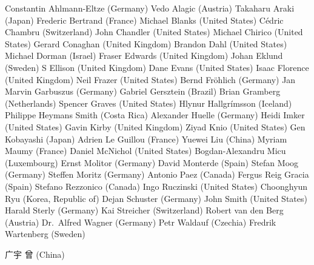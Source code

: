 Constantin Ahlmann-Eltze (Germany)
Vedo Alagic (Austria)
Takaharu Araki (Japan)
Frederic Bertrand (France)
Michael Blanks (United States)
Cédric Chambru (Switzerland)
John Chandler (United States)
Michael Chirico (United States)
Gerard Conaghan (United Kingdom)
Brandon Dahl (United States)
Michael Dorman (Israel)
Fraser Edwards (United Kingdom)
Johan Eklund (Sweden)
S Ellison (United Kingdom)
Dane Evans (United States)
Isaac Florence (United Kingdom)
Neil Frazer (United States)
Bernd Fröhlich (Germany)
Jan Marvin Garbuszus (Germany)
Gabriel Gersztein (Brazil)
Brian Gramberg (Netherlands)
Spencer Graves (United States)
Hlynur Hallgrímsson (Iceland)
Philippe Heymans Smith (Costa Rica)
Alexander Huelle (Germany)
Heidi Imker (United States)
Gavin Kirby (United Kingdom)
Ziyad Knio (United States)
Gen Kobayashi (Japan)
Adrien Le Guillou (France)
Yuewei Liu (China)
Myriam Maumy (France)
Daniel McNichol (United States)
Bogdan-Alexandru Micu (Luxembourg)
Ernst Molitor (Germany)
David Monterde (Spain)
Stefan Moog (Germany)
Steffen Moritz (Germany)
Antonio Paez (Canada)
Fergus Reig Gracia (Spain)
Stefano Rezzonico (Canada)
Ingo Ruczinski (United States)
Choonghyun Ryu (Korea, Republic of)
Dejan Schuster (Germany)
John Smith (United States)
Harald Sterly (Germany)
Kai Streicher (Switzerland)
Robert van den Berg (Austria)
Dr.~Alfred Wagner (Germany)
Petr Waldauf (Czechia)
Fredrik Wartenberg (Sweden)
\begin{CJK*}{UTF8}{gbsn} 
广宇 曾 (China) \end{CJK*}


\address{Torsten Hothorn \\
  Universit\"at Z\"urich, Switzerland}

